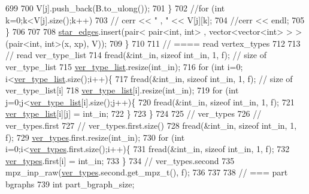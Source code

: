 \begin{DoxyCode}
699 
700         V[j].push\_back(B.to\_ulong());
701       \}
702       \textcolor{comment}{//for (int k=0;k<V[j].size();k++)}
703       \textcolor{comment}{//  cerr << " , " << V[j][k];}
704       \textcolor{comment}{//cerr << endl;}
705     \}
706 
707 
708     \hyperlink{classmarked__graph__compressed_a7df5779d313486644132bd816937f532}{star\_edges}.insert(pair< pair<int, int> , vector<vector<int> > > (pair<int, int>(x, xp), V));
709   \}
710 
711   \textcolor{comment}{// ==== read vertex\_types}
712 
713   \textcolor{comment}{// read ver\_type\_list}
714   fread(&int\_in, \textcolor{keyword}{sizeof} int\_in, 1, f); \textcolor{comment}{// size of ver\_type\_list}
715   \hyperlink{classmarked__graph__compressed_af2e3e55223d436628a02758dfae88493}{ver\_type\_list}.resize(int\_in);
716   \textcolor{keywordflow}{for} (\textcolor{keywordtype}{int} i=0; i<\hyperlink{classmarked__graph__compressed_af2e3e55223d436628a02758dfae88493}{ver\_type\_list}.size();i++)\{
717     fread(&int\_in, \textcolor{keyword}{sizeof} int\_in, 1, f); \textcolor{comment}{// size of ver\_type\_list[i]}
718     \hyperlink{classmarked__graph__compressed_af2e3e55223d436628a02758dfae88493}{ver\_type\_list}[i].resize(int\_in);
719     \textcolor{keywordflow}{for} (\textcolor{keywordtype}{int} j=0;j<\hyperlink{classmarked__graph__compressed_af2e3e55223d436628a02758dfae88493}{ver\_type\_list}[i].size();j++)\{
720       fread(&int\_in, \textcolor{keyword}{sizeof} int\_in, 1, f);
721       \hyperlink{classmarked__graph__compressed_af2e3e55223d436628a02758dfae88493}{ver\_type\_list}[i][j] = int\_in;
722     \}
723   \}
724 
725   \textcolor{comment}{// ver\_types}
726   \textcolor{comment}{// ver\_types.first}
727   \textcolor{comment}{// ver\_types.first.size()}
728   fread(&int\_in, \textcolor{keyword}{sizeof} int\_in, 1, f);
729   \hyperlink{classmarked__graph__compressed_af446cc5e23c241a92b76642fd5ebc403}{ver\_types}.first.resize(int\_in);
730   \textcolor{keywordflow}{for} (\textcolor{keywordtype}{int} i=0;i<\hyperlink{classmarked__graph__compressed_af446cc5e23c241a92b76642fd5ebc403}{ver\_types}.first.size();i++)\{
731     fread(&int\_in, \textcolor{keyword}{sizeof} int\_in, 1, f);
732     \hyperlink{classmarked__graph__compressed_af446cc5e23c241a92b76642fd5ebc403}{ver\_types}.first[i] = int\_in;
733   \}
734   \textcolor{comment}{// ver\_types.second}
735   mpz\_inp\_raw(\hyperlink{classmarked__graph__compressed_af446cc5e23c241a92b76642fd5ebc403}{ver\_types}.second.get\_mpz\_t(), f);
736 
737 
738   \textcolor{comment}{// === part bgraphs}
739   \textcolor{keywordtype}{int} part\_bgraph\_size;

\end{DoxyCode}
